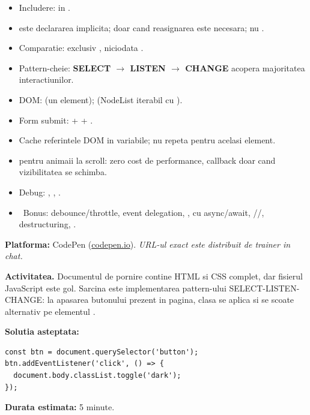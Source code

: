 \begin{recap}
\begin{itemize}[itemsep=1pt]
  \item Includere:  in .
  \item {} este declararea implicita;  doar cand reasignarea este necesara; nu .
  \item Comparatie: exclusiv \code{===}, niciodata \code{==}.
  \item Pattern-cheie: \textbf{SELECT $\to$ LISTEN $\to$ CHANGE} acopera majoritatea interactiunilor.
  \item DOM:  (un element);  (NodeList iterabil cu ).
  \item Form submit:  +  + .
  \item Cache referintele DOM in variabile; nu repeta  pentru acelasi element.
  \item {} pentru animaii la scroll: zero cost de performance, callback doar cand vizibilitatea se schimba.
  \item Debug: , , .
  \item \faRocket\ Bonus: debounce/throttle, event delegation, ,  cu async/await, //, destructuring, .
\end{itemize}
\end{recap}

\partdivider

\begin{joc}
\textbf{Platforma:} CodePen (\url{codepen.io}). \quad \textit{URL-ul exact este distribuit de trainer in chat.}

\medskip

\textbf{Activitatea.} Documentul de pornire contine HTML si CSS complet, dar fisierul JavaScript este gol. Sarcina este implementarea pattern-ului SELECT-LISTEN-CHANGE: la apasarea butonului prezent in pagina, clasa  se aplica si se scoate alternativ pe elementul .

\medskip

\textbf{Solutia asteptata:}

\begin{lstlisting}[style=js, numbers=none]
const btn = document.querySelector('button');
btn.addEventListener('click', () => {
  document.body.classList.toggle('dark');
});
\end{lstlisting}

\textbf{Durata estimata:} 5 minute.
\end{joc}


